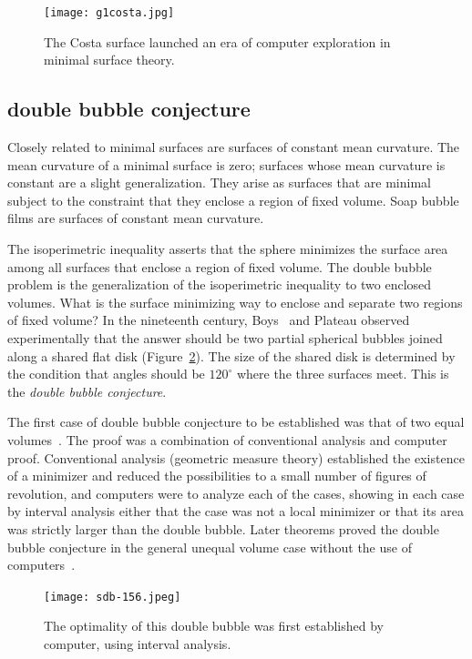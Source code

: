 \documentclass{llncs}
\begin{document}
\begin{figure}[h!]
  \centering
\texttt{[image: g1costa.jpg]}
  \caption{The Costa surface launched an era of computer exploration
in minimal surface theory.}
\label{fig:costa}
\end{figure}



\subsection{double bubble conjecture}

Closely related to minimal surfaces are surfaces of constant mean
curvature.  The mean curvature of a minimal surface is zero; surfaces
whose mean curvature is constant are a slight generalization.  They
arise as surfaces that are minimal subject to the constraint that
they enclose a region of fixed volume.  Soap bubble films are
surfaces of constant mean curvature.  

The isoperimetric inequality asserts that the sphere minimizes the
surface area among all surfaces that enclose a region of fixed volume.
The double bubble problem is the generalization of the isoperimetric
inequality to two enclosed volumes.  What is the surface minimizing way
to enclose and separate two regions of fixed volume?  In the
nineteenth century, Boys~\cite{Boy1890} and Plateau observed
experimentally that the answer should be two partial spherical bubbles
joined along a shared flat disk (Figure~\ref{fig:double}).  The size of the shared
disk is determined by the condition that angles should be $120^\circ$
where the three surfaces meet.  This is the {\it double bubble
  conjecture}.

The first case of double bubble conjecture to be established was that
of two equal volumes~\cite{HHS95}.  The proof was a combination of conventional
analysis and computer proof.  Conventional analysis (geometric measure
theory) established the existence of a minimizer and reduced the
possibilities to a small number of figures of revolution, and
computers were to analyze each of the cases, showing in each case by
interval analysis either that the case was not a local minimizer or
that its area was strictly larger than the double bubble.  Later
theorems proved the double bubble conjecture in the general unequal
volume case without the use of computers~\cite{HMRR}.

\begin{figure}[h!]
  \centering
\texttt{[image: sdb-156.jpeg]}
  \caption{The optimality of this double bubble was first established by
computer, using interval analysis.}
\label{fig:double}
\end{figure}
\end{document}
